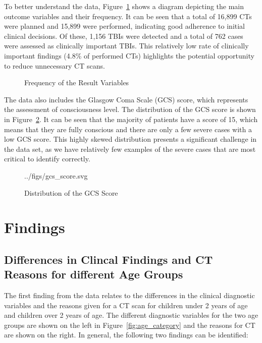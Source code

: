 \documentclass[10pt,letterpaper]{article}
\begin{document}
To better understand the data, Figure~\ref{fig:overview_result_variables} shows a diagram depicting the main outcome variables and their frequency. It can be seen that a total of 16,899 CTs were planned and 15,899 were performed, indicating good adherence to initial clinical decisions. Of these, 1,156 TBIs were detected and a total of 762 cases were assessed as clinically important TBIs. This relatively low rate of clinically important findings (4.8\% of performed CTs) highlights the potential opportunity to reduce unnecessary CT scans.

\begin{figure}[H]
    \centering
    \caption{Frequency of the Result Variables}
    \label{fig:overview_result_variables}
\end{figure}

The data also includes the Glasgow Coma Scale (GCS) score, which represents the assessment of consciousness level. The distribution of the GCS score is shown in Figure~\ref{fig:gcs_score}. It can be seen that the majority of patients have a score of 15, which means that they are fully conscious and there are only a few severe cases with a low GCS score. This highly skewed distribution presents a significant challenge in the data set, as we have relatively few examples of the severe cases that are most critical to identify correctly.

\begin{figure}[H]
    \centering
    
    {../figs/gcs_score.svg} %
    \caption{Distribution of the GCS Score}
    \label{fig:gcs_score}
\end{figure}

\section{Findings}\label{findings}

\subsection{Differences in Clincal Findings and CT Reasons for different Age Groups}\label{first-finding}

The first finding from the data relates to the differences in the clinical diagnostic variables and the reasons given for a CT scan for children under 2 years of age and children over 2 years of age. The different diagnostic variables for the two age groups are shown on the left in Figure~\ref{fig:age_category} and the reasons for CT are shown on the right. In general, the following two findings can be identified:
\end{document}
